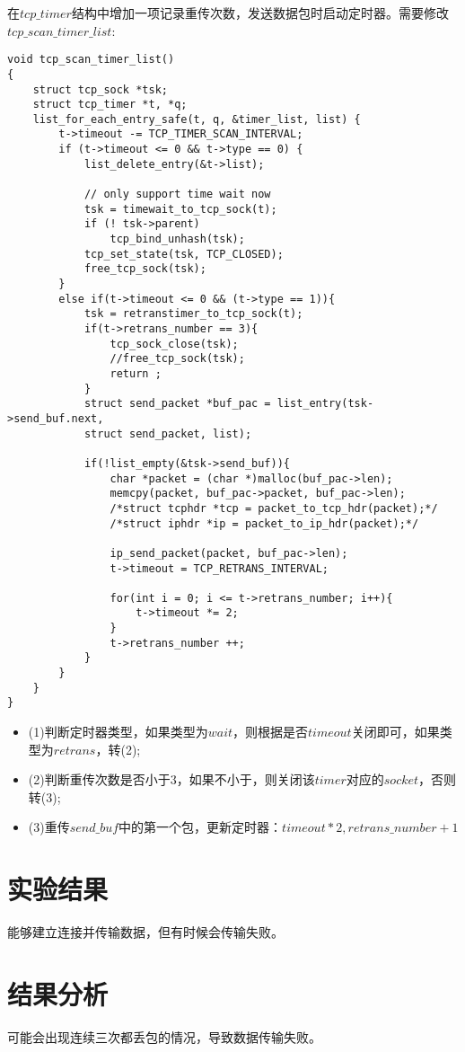 \documentclass[UTF8,noindent]{ctexart}
\begin{document}
在$tcp\_timer$结构中增加一项记录重传次数，发送数据包时启动定时器。需要修改$tcp\_scan\_timer\_list$:
\begin{lstlisting}
void tcp_scan_timer_list()
{
	struct tcp_sock *tsk;
	struct tcp_timer *t, *q;
	list_for_each_entry_safe(t, q, &timer_list, list) {
		t->timeout -= TCP_TIMER_SCAN_INTERVAL;
		if (t->timeout <= 0 && t->type == 0) {
			list_delete_entry(&t->list);

			// only support time wait now
			tsk = timewait_to_tcp_sock(t);
			if (! tsk->parent)
				tcp_bind_unhash(tsk);
			tcp_set_state(tsk, TCP_CLOSED);
			free_tcp_sock(tsk);
		}
		else if(t->timeout <= 0 && (t->type == 1)){
			tsk = retranstimer_to_tcp_sock(t);
            if(t->retrans_number == 3){
            	tcp_sock_close(tsk);
                //free_tcp_sock(tsk);
                return ;
            }
            struct send_packet *buf_pac = list_entry(tsk->send_buf.next, 
			struct send_packet, list);

            if(!list_empty(&tsk->send_buf)){
                char *packet = (char *)malloc(buf_pac->len);
                memcpy(packet, buf_pac->packet, buf_pac->len);
                /*struct tcphdr *tcp = packet_to_tcp_hdr(packet);*/
                /*struct iphdr *ip = packet_to_ip_hdr(packet);*/

                ip_send_packet(packet, buf_pac->len);
                t->timeout = TCP_RETRANS_INTERVAL;

			    for(int i = 0; i <= t->retrans_number; i++){
			    	t->timeout *= 2;
			    }
			    t->retrans_number ++;
			}
		}
	}
}
\end{lstlisting}
  \begin{itemize}
	\item (1)判断定时器类型，如果类型为$wait$，则根据是否$timeout$关闭即可，如果类型为$retrans$，转(2);
	\item (2)判断重传次数是否小于$3$，如果不小于，则关闭该$timer$对应的$socket$，否则转(3);
	\item (3)重传$send\_buf$中的第一个包，更新定时器：$timeout*2, retrans\_number + 1$
  \end{itemize}


\section{{实验结果}}
能够建立连接并传输数据，但有时候会传输失败。

\section{{结果分析}}
可能会出现连续三次都丢包的情况，导致数据传输失败。
\end{document}
